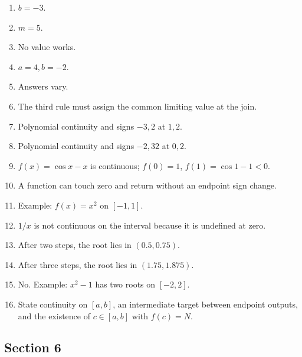 \begin{enumerate}[label=\textbf{5.\arabic*}]
  \item \(b=-3\).
  \item \(m=5\).
  \item No value works.
  \item \(a=4,b=-2\).
  \item Answers vary.
  \item The third rule must assign the common limiting value at the join.
  \item Polynomial continuity and signs \(-3,2\) at \(1,2\).
  \item Polynomial continuity and signs \(-2,32\) at \(0,2\).
  \item \(f(x)=\cos x-x\) is continuous; \(f(0)=1\), \(f(1)=\cos1-1<0\).
  \item A function can touch zero and return without an endpoint sign change.
  \item Example: \(f(x)=x^2\) on \([-1,1]\).
  \item \(1/x\) is not continuous on the interval because it is undefined at zero.
  \item After two steps, the root lies in \((0.5,0.75)\).
  \item After three steps, the root lies in \((1.75,1.875)\).
  \item No. Example: \(x^2-1\) has two roots on \([-2,2]\).
  \item State continuity on \([a,b]\), an intermediate target between endpoint outputs, and the existence of \(c\in[a,b]\) with \(f(c)=N\).
\end{enumerate}

\subsection*{Section 6}

